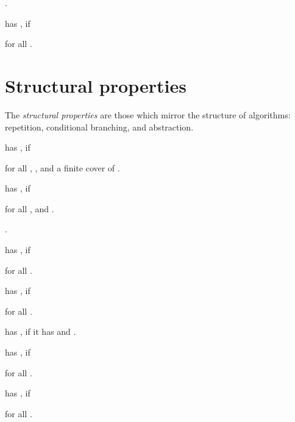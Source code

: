\documentclass[b5paper, english, oneside]{memoir}
\begin{document}
\begin{example}
.
\end{example}

\begin{definition}
 has , if

for all .
\end{definition}

\section{Structural properties}

The \emph{structural properties} are those which mirror the structure of algorithms: repetition, conditional branching, and abstraction.

\begin{definition}
 has , if

for all , , and  a finite cover of .
\end{definition}

\begin{definition}
 has , if

for all , and .
\end{definition}

\begin{example}
.
\end{example}

\begin{definition}
 has , if

for all .
\end{definition}

\begin{definition}
 has , if

for all .
\end{definition}

\begin{definition}
 has , if it has  and .
\end{definition}

\begin{definition}
 has , if

for all .
\end{definition}

\begin{definition}
 has , if

for all .
\end{definition}
\end{document}
